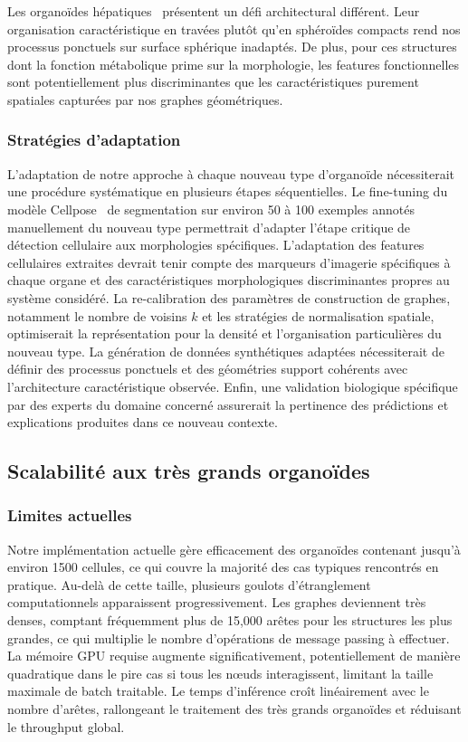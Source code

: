 Les organoïdes hépatiques~\cite{Huch2015} présentent un défi architectural différent. Leur organisation caractéristique en travées plutôt qu'en sphéroïdes compacts rend nos processus ponctuels sur surface sphérique inadaptés. De plus, pour ces structures dont la fonction métabolique prime sur la morphologie, les features fonctionnelles sont potentiellement plus discriminantes que les caractéristiques purement spatiales capturées par nos graphes géométriques.

\subsubsection{Stratégies d'adaptation}

L'adaptation de notre approche à chaque nouveau type d'organoïde nécessiterait une procédure systématique en plusieurs étapes séquentielles. Le fine-tuning du modèle Cellpose~\cite{Stringer2021} de segmentation sur environ 50 à 100 exemples annotés manuellement du nouveau type permettrait d'adapter l'étape critique de détection cellulaire aux morphologies spécifiques. L'adaptation des features cellulaires extraites devrait tenir compte des marqueurs d'imagerie spécifiques à chaque organe et des caractéristiques morphologiques discriminantes propres au système considéré. La re-calibration des paramètres de construction de graphes, notamment le nombre de voisins $k$ et les stratégies de normalisation spatiale, optimiserait la représentation pour la densité et l'organisation particulières du nouveau type. La génération de données synthétiques adaptées nécessiterait de définir des processus ponctuels et des géométries support cohérents avec l'architecture caractéristique observée. Enfin, une validation biologique spécifique par des experts du domaine concerné assurerait la pertinence des prédictions et explications produites dans ce nouveau contexte.

\subsection{Scalabilité aux très grands organoïdes}

\subsubsection{Limites actuelles}

Notre implémentation actuelle gère efficacement des organoïdes contenant jusqu'à environ 1500 cellules, ce qui couvre la majorité des cas typiques rencontrés en pratique. Au-delà de cette taille, plusieurs goulots d'étranglement computationnels apparaissent progressivement. Les graphes deviennent très denses, comptant fréquemment plus de 15,000 arêtes pour les structures les plus grandes, ce qui multiplie le nombre d'opérations de message passing à effectuer. La mémoire GPU requise augmente significativement, potentiellement de manière quadratique dans le pire cas si tous les nœuds interagissent, limitant la taille maximale de batch traitable. Le temps d'inférence croît linéairement avec le nombre d'arêtes, rallongeant le traitement des très grands organoïdes et réduisant le throughput global.

